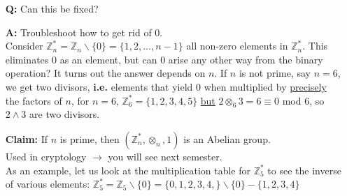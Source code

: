 \documentclass[10pt]{article}
\begin{document}
\begin{description}
\begin{enumerate}
			\item[\textbf{Q:}] Can this be fixed?
			\item[\textbf{A:}] Troubleshoot how to get rid of 0. \\
			Consider $\mathbb{Z}_n^* = \mathbb{Z}_n \backslash \{0\} = \{1, 2, \dots, n-1\}$ all non-zero elements in $\mathbb{Z}_n^*$. This eliminates 0 as an element, but can 0 arise any other way from the binary operation? It turns out the answer depends on $n$. If $n$ is not prime, say $n=6$, we get two divisors, \textbf{i.e.} elements that yield 0 when multiplied by \underline{precisely} the factors of $n$, for $n=6$, $\mathbb{Z}^*_6 = \{1, 2, 3, 4, 5\}$ \underline{but} $2 \otimes _6 3 = 6 \equiv 0$ mod $6$, so $2 \land 3$ are two divisors.
			\item[\textbf{Claim:}] If $n$ is prime, then $(\mathbb{Z}_n^*, \otimes _n, 1)$ is an Abelian group. \\
			Used in cryptology $\rightarrow$ you will see next semester. \\
			As an example, let us look at the multiplication table for $\mathbb{Z}_5^*$ to see the inverse of various elements: $\mathbb{Z}^*_5 = \mathbb{Z}_5 \backslash \{0\} = \{0, 1, 2, 3, 4,\} \backslash \{0\} - \{1, 2, 3, 4\}$
	

\end{enumerate}
\end{description}
\end{document}
